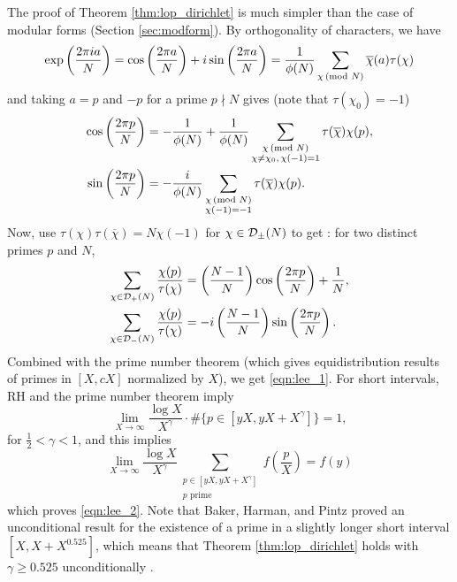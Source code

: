The proof of Theorem \ref{thm:lop_dirichlet} is much simpler than the case of modular forms (Section \ref{sec:modform}).
By orthogonality of characters, we have
\[
\exp\left(\frac{2 \pi i a}{N}\right) = \cos\left(\frac{2 \pi a}{N}\right) + i \sin\left(\frac{2 \pi a}{N}\right) = \frac{1}{\phi(N)} \sum_{\chi \,(\text{mod }N)} \overline{\chi}(a) \tau(\chi)
\]
and taking $a = p$ and $-p$ for a prime $p \nmid N$ gives (note that $\tau(\chi_0) = -1$)
\begin{align*}
    \cos \left(\frac{2\pi p}{N}\right) &= -\frac{1}{\phi(N)} + \frac{1}{\phi(N)} \sum_{\substack{\chi\,(\text{mod }N) \\ \chi \ne \chi_0,\,\chi(-1) = 1}} \tau(\overline{\chi}) \chi(p), \\
    \sin \left(\frac{2 \pi p}{N}\right) &= - \frac{i}{\phi(N)} \sum_{\substack{\chi \,(\text{mod }N) \\ \chi(-1) = -1}} \tau(\overline{\chi}) \chi(p).
\end{align*}
Now, use $\tau(\chi) \tau(\overline{\chi}) = N \chi(-1)$ for $\chi \in \mathcal{D}_{\pm}(N)$ to get \cite[Lemma 2.6]{lee2025murmurations}: for two distinct primes $p$ and $N$,
\begin{align*}
    \sum_{\chi \in \mathcal{D}_{+}(N)} \frac{\chi(p)}{\tau(\chi)} &= \left(\frac{N-1}{N}\right) \cos \left(\frac{2 \pi p}{N}\right) + \frac{1}{N}, \\
    \sum_{\chi \in \mathcal{D}_{-}(N)} \frac{\chi(p)}{\tau(\chi)} &= -i\left(\frac{N-1}{N}\right) \sin \left(\frac{2 \pi p}{N}\right).
\end{align*}
Combined with the prime number theorem (which gives equidistribution results of primes in $[X, cX]$ normalized by $X$), we get \eqref{eqn:lee_1}.
For short intervals, RH and the prime number theorem imply
\[
\lim_{X \to \infty} \frac{\log X}{X^\gamma}\cdot \#\{p \in [yX, yX + X^\gamma]\} = 1,
\]
for $\frac{1}{2} < \gamma < 1$, and this implies \cite[Lemma 2.9]{lee2025murmurations} 
\begin{equation}
\label{eqn:short_avg}
\lim_{X \to \infty} \frac{\log X}{X^\gamma} \sum_{\substack{p \in [yX, yX + X^\gamma] \\ p \text{ prime}}} f\left(\frac{p}{X}\right) = f(y)
\end{equation}
which proves \eqref{eqn:lee_2}.
Note that Baker, Harman, and Pintz proved an unconditional result for the existence of a prime in a slightly longer short interval $[X, X + X^{0.525}]$, which means that Theorem \ref{thm:lop_dirichlet} holds with $\gamma \ge 0.525$ unconditionally \cite{baker2001difference}.

